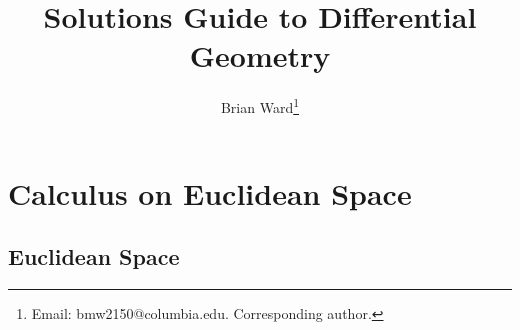 \documentclass[12pt]{article}
\numberwithin{theorem}{section}
\numberwithin{equation}{section}
\numberwithin{remark}{section}
\numberwithin{definition}{section}
\numberwithin{theorem}{section}
\numberwithin{lemma}{section}
\numberwithin{example}{section}
\begin{document}
\title{Solutions Guide to Differential Geometry}
\author{Brian Ward\thanks{Email: {bmw2150@columbia.edu}. Corresponding author. }} 
\maketitle
{}

\tableofcontents

\newpage

\section{Calculus on Euclidean Space}
\subsection{Euclidean Space}
\end{document}
